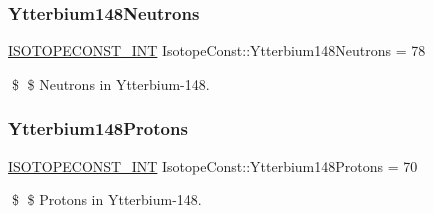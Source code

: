 \subsubsection{\texorpdfstring{Ytterbium148\+Neutrons}{Ytterbium148Neutrons}}
{\footnotesize\ttfamily \mbox{\hyperlink{group___isotope_const-_macros_ga5f18360b3e99483a35c32d789e62621c}{I\+S\+O\+T\+O\+P\+E\+C\+O\+N\+S\+T\+\_\+\+I\+NT}} Isotope\+Const\+::\+Ytterbium148\+Neutrons = 78}

\$ \$ Neutrons in Ytterbium-\/148. \mbox{\label{group___isotope_const-_ytterbium-_yb148_gac3271a07ce3daf46b86186422b59bd7a}} 
\subsubsection{\texorpdfstring{Ytterbium148\+Protons}{Ytterbium148Protons}}
{\footnotesize\ttfamily \mbox{\hyperlink{group___isotope_const-_macros_ga5f18360b3e99483a35c32d789e62621c}{I\+S\+O\+T\+O\+P\+E\+C\+O\+N\+S\+T\+\_\+\+I\+NT}} Isotope\+Const\+::\+Ytterbium148\+Protons = 70}

\$ \$ Protons in Ytterbium-\/148. 
